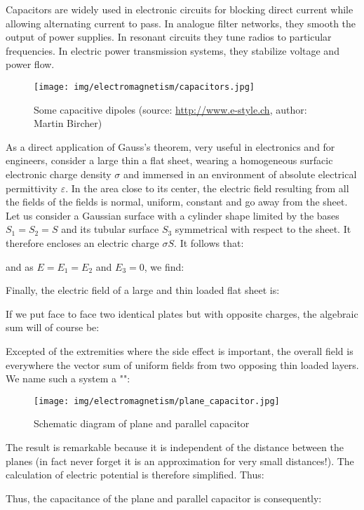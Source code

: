 	Capacitors are widely used in electronic circuits for blocking direct current while allowing alternating current to pass. In analogue filter networks, they smooth the output of power supplies. In resonant circuits they tune radios to particular frequencies. In electric power transmission systems, they stabilize voltage and power flow.
	\begin{figure}[H]
		\centering
		\texttt{[image: img/electromagnetism/capacitors.jpg]}
		\caption[Some capacitive dipoles]{Some capacitive dipoles (source: \url{http://www.e-style.ch}, author: Martin Bircher)}
	\end{figure}
	As a direct application of Gauss's theorem, very useful in electronics and for engineers, consider a large thin a flat sheet, wearing a homogeneous surfacic electronic charge density $\sigma$ and immersed in an environment of absolute electrical permittivity $\varepsilon$. In the area close to its center, the electric field resulting from all the fields of the fields is normal, uniform, constant and go away from the sheet. Let us consider a Gaussian surface with a cylinder shape limited by the bases $S_1=S_2=S$ and its tubular surface $S_3$ symmetrical with respect to the sheet. It therefore encloses an electric charge $\sigma S$. It follows that:
	
	and as $E=E_1=E_2$ and $E_3=0$, we find:
	
		Finally, the electric field of a large and thin loaded flat sheet is:
	
	If we put face to face two identical plates but with opposite charges, the algebraic sum will of course be:
	
	Excepted of the extremities where the side effect is important, the overall field is everywhere the vector sum of uniform fields from two opposing thin loaded layers. We name such a system a "":
	\begin{figure}[H]
		\centering
		\texttt{[image: img/electromagnetism/plane\_capacitor.jpg]}
		\caption{Schematic diagram of plane and parallel capacitor}
	\end{figure}
	The result is remarkable because it is independent of the distance between the planes (in fact never forget it is an approximation for very small distances!). The calculation of electric potential is therefore simplified. Thus:
	
	Thus, the capacitance of the plane and parallel capacitor is consequently:
	
